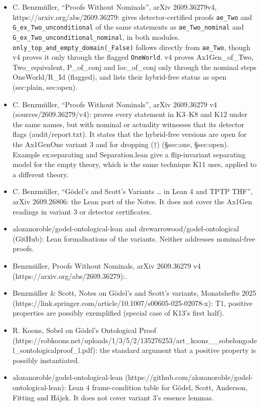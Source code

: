 \documentclass{article}
\begin{document}
\begin{itemize}
\item C. Benzmüller, ``Proofs Without Nominals'', arXiv 2609.36279v4, https://arxiv.org/abs/2609.36279: gives detector-certified proofs \texttt{ae\_Two} and \texttt{G\_ex\_Two\_unconditional} of the same statements as \texttt{ae\_Two\_nominal} and \texttt{G\_ex\_Two\_unconditional\_nominal}, in both modules. \texttt{only\_top\_and\_empty\_domain(\_False)} follows directly from \texttt{ae\_Two}, though v4 proves it only through the flagged \texttt{OneWorld}. v4 proves Ax1Gen\_of\_Two, Two\_equivalent, P\_of\_conj and loc\_of\_conj only through the nominal steps OneWorld/R\_Id (flagged), and lists their hybrid-free status as open (sec:plain, sec:open).
\item C. Benzmüller, ``Proofs Without Nominals'', arXiv 2609.36279 v4 (sources/2609.36279/v4): proves every statement in K3--K8 and K12 under the same names, but with nominal or actuality witnesses that its detector flags (audit/report.txt). It states that the hybrid-free versions are open for the Ax1GenOne variant 3 and for dropping (†) (\S{}sec:one, \S{}sec:open). Example ex:separating and Separation.lean give a flip-invariant separating model for the empty theory, which is the same technique K11 uses, applied to a different theory.
\item C. Benzmüller, ``Gödel's and Scott's Variants \ldots{} in Lean 4 and TPTP THF'', arXiv 2609.26806: the Lean port of the Notes. It does not cover the Ax1Gen readings in variant 3 or detector certificates.
\item alozanoroble/godel-ontological-lean and drewarrowood/godel-ontological (GitHub): Lean formalisations of the variants. Neither addresses nominal-free proofs.
\item Benzmüller, Proofs Without Nominals, arXiv 2609.36279 v4 (https://arxiv.org/abs/2609.36279):.
\item Benzmüller \& Scott, Notes on Gödel's and Scott's variants, Monatshefte 2025 (https://link.springer.com/article/10.1007/s00605-025-02078-x): T1, positive properties are possibly exemplified (special case of K13's first half).
\item R. Koons, Sobel on Gödel's Ontological Proof (https://robkoons.net/uploads/1/3/5/2/135276253/art\_koons\_\_sobelongodel\_sontologicalproof\_l.pdf): the standard argument that a positive property is possibly instantiated.
\item alozanoroble/godel-ontological-lean (https://github.com/alozanoroble/godel-ontological-lean): Lean 4 frame-condition table for Gödel, Scott, Anderson, Fitting and Hájek. It does not cover variant 3's essence lemmas.
\end{itemize}
\end{document}
